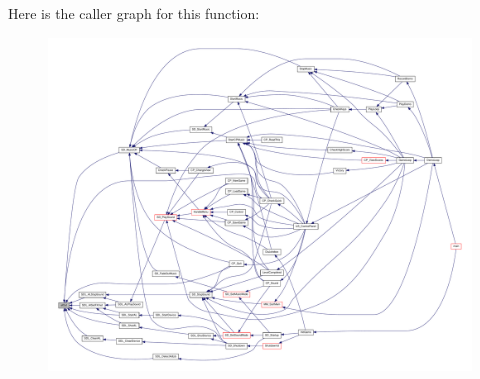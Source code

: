 Here is the caller graph for this function:
\nopagebreak
\begin{figure}[H]
\begin{center}
\leavevmode
\includegraphics[width=400pt]{ID__SD_8H_a022c0a65b79644cb7ea86a2ce77b3c42_icgraph}
\end{center}
\end{figure}


